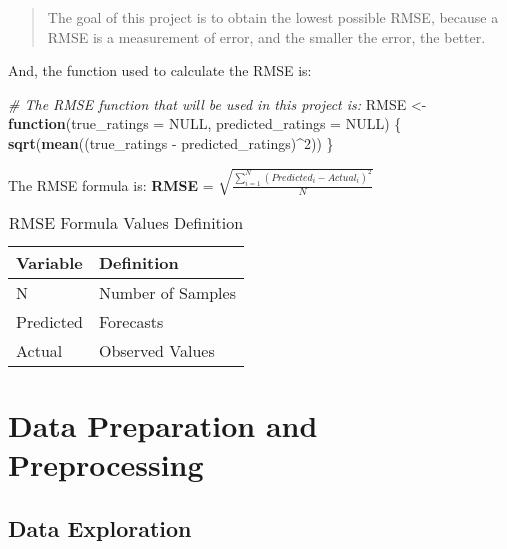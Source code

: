 \documentclass[]{article}
\newenvironment{Shaded}{}{}
\newcommand{\CommentTok}[1]{\textcolor[rgb]{0.38,0.63,0.69}{\textit{#1}}}
\newcommand{\ControlFlowTok}[1]{\textcolor[rgb]{0.00,0.44,0.13}{\textbf{#1}}}
\newcommand{\DataTypeTok}[1]{\textcolor[rgb]{0.56,0.13,0.00}{#1}}
\newcommand{\DecValTok}[1]{\textcolor[rgb]{0.25,0.63,0.44}{#1}}
\newcommand{\KeywordTok}[1]{\textcolor[rgb]{0.00,0.44,0.13}{\textbf{#1}}}
\newcommand{\NormalTok}[1]{#1}
\newcommand{\OperatorTok}[1]{\textcolor[rgb]{0.40,0.40,0.40}{#1}}
\newcommand{\OtherTok}[1]{\textcolor[rgb]{0.00,0.44,0.13}{#1}}
\newcommand{\StringTok}[1]{\textcolor[rgb]{0.25,0.44,0.63}{#1}}
\begin{document}
\begin{quote}
The goal of this project is to obtain the lowest possible RMSE, because
a RMSE is a measurement of error, and the smaller the error, the better.
\end{quote}

And, the function used to calculate the RMSE is:

\begin{Shaded}
\begin{Highlighting}[]
\CommentTok{# The RMSE function that will be used in this project is:}
\NormalTok{RMSE <-}\StringTok{ }\ControlFlowTok{function}\NormalTok{(}\DataTypeTok{true_ratings =} \OtherTok{NULL}\NormalTok{, }\DataTypeTok{predicted_ratings =} \OtherTok{NULL}\NormalTok{) \{}
    \KeywordTok{sqrt}\NormalTok{(}\KeywordTok{mean}\NormalTok{((true_ratings }\OperatorTok{-}\StringTok{ }\NormalTok{predicted_ratings)}\OperatorTok{^}\DecValTok{2}\NormalTok{))}
\NormalTok{\}}
\end{Highlighting}
\end{Shaded}

The RMSE formula is: \textbf{RMSE} =
\(\sqrt{\frac{\sum_{i=1}^N (Predicted_i - Actual_i)^2}{N}}\)

\begin{table}[!h]

\caption{\label{tab:rmse.formula}RMSE Formula Values Definition}
\centering
\begin{tabular}{ll}
\toprule
Variable & Definition\\
\midrule
\rowcolor{gray!6}  N & Number of Samples\\
Predicted & Forecasts\\
\rowcolor{gray!6}  Actual & Observed Values\\
\bottomrule
\end{tabular}
\end{table}

\pagebreak

\hypertarget{data-preparation-and-preprocessing}{%
\section{Data Preparation and
Preprocessing}\label{data-preparation-and-preprocessing}}

\hypertarget{data-exploration}{%
\subsection{Data Exploration}\label{data-exploration}}
\end{document}

